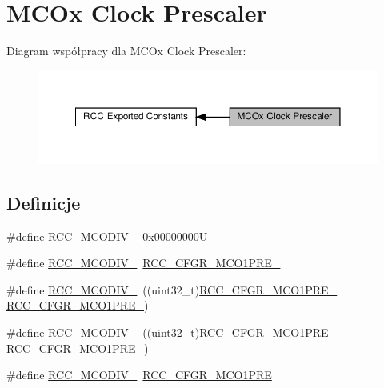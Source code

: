 \hypertarget{group___r_c_c___m_c_ox___clock___prescaler}{}\section{M\+C\+Ox Clock Prescaler}
\label{group___r_c_c___m_c_ox___clock___prescaler}
Diagram współpracy dla M\+C\+Ox Clock Prescaler\+:\nopagebreak
\begin{figure}[H]
\begin{center}
\leavevmode
\includegraphics[width=350pt]{group___r_c_c___m_c_ox___clock___prescaler}
\end{center}
\end{figure}
\subsection*{Definicje}
\begin{DoxyCompactItemize}
\item 
\#define \hyperlink{group___r_c_c___m_c_ox___clock___prescaler_ga438d8c3bead4e1ec5dd5757cb0313d53}{R\+C\+C\+\_\+\+M\+C\+O\+D\+I\+V\+\_}~0x00000000U
\item 
\#define \hyperlink{group___r_c_c___m_c_ox___clock___prescaler_ga6198330847077f4da351915518140bfc}{R\+C\+C\+\_\+\+M\+C\+O\+D\+I\+V\+\_}~\hyperlink{group___peripheral___registers___bits___definition_ga11e1d10d1b55e0d88d24212ea2c8ba6e}{R\+C\+C\+\_\+\+C\+F\+G\+R\+\_\+\+M\+C\+O1\+P\+R\+E\+\_}
\item 
\#define \hyperlink{group___r_c_c___m_c_ox___clock___prescaler_gab9dac03733c3c5bd8877ef43bff3d5f4}{R\+C\+C\+\_\+\+M\+C\+O\+D\+I\+V\+\_}~((uint32\+\_\+t)\hyperlink{group___peripheral___registers___bits___definition_gac8007a9d6ee3fd88912aaf290746ae0e}{R\+C\+C\+\_\+\+C\+F\+G\+R\+\_\+\+M\+C\+O1\+P\+R\+E\+\_} $\vert$ \hyperlink{group___peripheral___registers___bits___definition_ga11e1d10d1b55e0d88d24212ea2c8ba6e}{R\+C\+C\+\_\+\+C\+F\+G\+R\+\_\+\+M\+C\+O1\+P\+R\+E\+\_})
\item 
\#define \hyperlink{group___r_c_c___m_c_ox___clock___prescaler_ga1bdc2eb56aaeb53dc3ca5cd72f22d4c8}{R\+C\+C\+\_\+\+M\+C\+O\+D\+I\+V\+\_}~((uint32\+\_\+t)\hyperlink{group___peripheral___registers___bits___definition_gaaf7c1280f61d56b4897f9c876987e092}{R\+C\+C\+\_\+\+C\+F\+G\+R\+\_\+\+M\+C\+O1\+P\+R\+E\+\_} $\vert$ \hyperlink{group___peripheral___registers___bits___definition_ga11e1d10d1b55e0d88d24212ea2c8ba6e}{R\+C\+C\+\_\+\+C\+F\+G\+R\+\_\+\+M\+C\+O1\+P\+R\+E\+\_})
\item 
\#define \hyperlink{group___r_c_c___m_c_ox___clock___prescaler_ga67292dd05ceb8189ec439d4ac4d58b88}{R\+C\+C\+\_\+\+M\+C\+O\+D\+I\+V\+\_}~\hyperlink{group___peripheral___registers___bits___definition_ga23171ca70972a106109a6e0804385ec5}{R\+C\+C\+\_\+\+C\+F\+G\+R\+\_\+\+M\+C\+O1\+P\+RE}
\end{DoxyCompactItemize}


